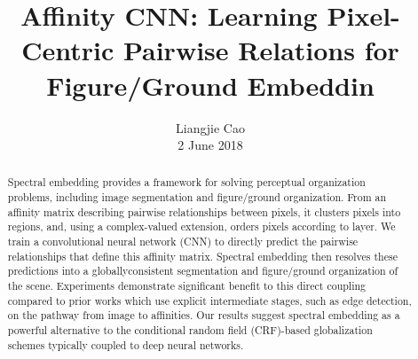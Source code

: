 \documentclass[10pt,twocolumn,letterpaper]{article}
\begin{document}
\title{\textbf{Affinity CNN: Learning Pixel-Centric Pairwise Relations for Figure/Ground Embeddin}}
\author{Liangjie Cao\\2 June 2018}
\maketitle
\begin{abstract}
Spectral embedding provides a framework for solving perceptual organization problems, including image segmentation and figure/ground organization. From an affinity matrix describing pairwise relationships between pixels, it clusters pixels into regions, and, using a complex-valued extension, orders pixels according to layer. We train a convolutional neural network (CNN) to directly predict the pairwise relationships that define this affinity matrix. Spectral embedding then resolves these predictions into a globallyconsistent segmentation and figure/ground organization of the scene. Experiments demonstrate significant benefit to this direct coupling compared to prior works which use explicit intermediate stages, such as edge detection, on the pathway from image to affinities. Our results suggest spectral embedding as a powerful alternative to the conditional random field (CRF)-based globalization schemes typically coupled to deep neural networks.
\end{abstract}
\end{document}
